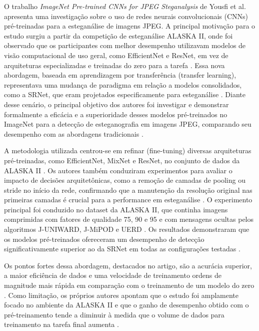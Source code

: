 \documentclass[12pt]{article}
\begin{document}
O trabalho \textit{ImageNet Pre-trained CNNs for JPEG Steganalysis} de Yousfi et al. apresenta uma investigação sobre o uso de redes neurais convolucionais (CNNs) pré-treinadas para a esteganálise de imagens JPEG. A principal motivação para o estudo surgiu a partir da competição de esteganálise ALASKA II, onde foi observado que os participantes com melhor desempenho utilizavam modelos de visão computacional de uso geral, como EfficientNet e ResNet, em vez de arquiteturas especializadas e treinadas do zero para a tarefa \cite{fridrich2021EfficientNet}. Essa nova abordagem, baseada em aprendizagem por transferência (transfer learning), representava uma mudança de paradigma em relação a modelos consolidados, como a SRNet, que eram projetados especificamente para esteganálise \cite{fridrich2021EfficientNet}. Diante desse cenário, o principal objetivo dos autores foi investigar e demonstrar formalmente a eficácia e a superioridade desses modelos pré-treinados no ImageNet para a detecção de esteganografia em imagens JPEG, comparando seu desempenho com as abordagens tradicionais \cite{fridrich2021EfficientNet}.

A metodologia utilizada centrou-se em refinar (fine-tuning) diversas arquiteturas pré-treinadas, como EfficientNet, MixNet e ResNet, no conjunto de dados da ALASKA II \cite{fridrich2021EfficientNet}. Os autores também conduziram experimentos para avaliar o impacto de decisões arquitetônicas, como a remoção de camadas de pooling ou stride no início da rede, confirmando que a manutenção da resolução original nas primeiras camadas é crucial para a performance em esteganálise \cite{fridrich2021EfficientNet}. O experimento principal foi conduzido no dataset da ALASKA II, que continha imagens comprimidas com fatores de qualidade 75, 90 e 95 e com mensagens ocultas pelos algoritmos J-UNIWARD, J-MiPOD e UERD \cite{fridrich2021EfficientNet}. Os resultados demonstraram que os modelos pré-treinados ofereceram um desempenho de detecção significativamente superior ao da SRNet em todas as configurações testadas \cite{fridrich2021EfficientNet}.

Os pontos fortes dessa abordagem, destacados no artigo, são a acurácia superior, a maior eficiência de dados e uma velocidade de treinamento ordens de magnitude mais rápida em comparação com o treinamento de um modelo do zero \cite{fridrich2021EfficientNet}. Como limitação, os próprios autores apontam que o estudo foi amplamente focado no ambiente da ALASKA II e que o ganho de desempenho obtido com o pré-treinamento tende a diminuir à medida que o volume de dados para treinamento na tarefa final aumenta \cite{fridrich2021EfficientNet}. 
\end{document}
